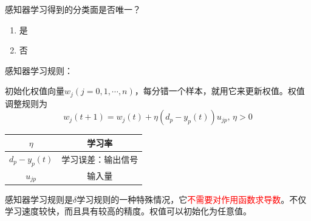 \begin{example}
    感知器学习得到的分类面是否唯一？
    \begin{enumerate}[A]
        \item 是
        \item \textcolor{main1}{否}
    \end{enumerate}
\end{example}
\begin{note}
    感知器学习规则：

    初始化权值向量$w_j (j = 0,1,\cdots,n)$，每分错一个样本，就用它来更新权值。权值调整规则为
    \[
        w_j(t+1) = w_j(t)+\eta\left( d_p-y_p(t) \right)u_{jp},\,\eta>0
    \]
    \begin{table}[htbp]
        \centering
        \begin{tabular}{|c|c|}
        \hline
        $\eta$ & 学习率 \\ \hline
        $d_p-y_p(t)$ & 学习误差：输出信号 \\ \hline
        $u_{jp}$ & 输入量 \\ \hline
        \end{tabular}%
    \end{table}%
\end{note}
感知器学习规则是$\delta$学习规则的一种特殊情况，它\textcolor{red}{不需要对作用函数求导数}。不仅学习速度较快，而且具有较高的精度。权值可以初始化为任意值。
